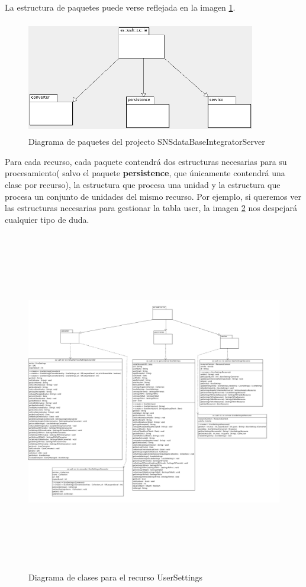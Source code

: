 \bigskip
\par
La estructura de paquetes puede verse reflejada en la imagen \ref{imgPackageSNSdataBaseIntegratorServer}.
\begin{figure}[h]
\begin{center}
\includegraphics[width=10cm,height=5cm]{Figuras/imgPackageSNSdataBaseIntegratorServer.png}
\end{center}
\caption{\label{imgPackageSNSdataBaseIntegratorServer} Diagrama de paquetes del projecto SNSdataBaseIntegratorServer}
\end{figure}
Para cada recurso, cada paquete contendrá dos estructuras necesarias para su procesamiento( salvo el paquete \textbf{persistence}, que únicamente contendrá una clase por recurso), la estructura que procesa una unidad y la estructura que procesa un conjunto de unidades del mismo recurso. Por ejemplo, si queremos ver las estructuras necesarias para gestionar la tabla user, la imagen \ref{imgPackUser} nos despejará cualquier tipo de duda.
\begin{figure}[h]
\begin{center}
\includegraphics[width=18cm,height=15cm]{Figuras/imgPackUser.png}
\end{center}
\caption{\label{imgPackUser} Diagrama de clases para el recurso UserSettings}
\end{figure}

